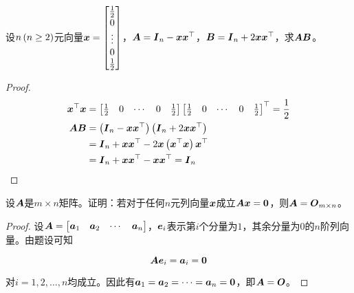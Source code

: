 \begin{problem}\label{problem-1.13}
设\(n\left( n\ge2 \right)\)元向量\(\boldsymbol{x}=\begin{bmatrix}\frac12\\0\\\vdots\\0\\\frac12\end{bmatrix}\)，\(\boldsymbol{A}=\boldsymbol{I}_n-\boldsymbol{x}\boldsymbol{x}^\top\)，\(\boldsymbol{B}=\boldsymbol{I}_n+2\boldsymbol{x}\boldsymbol{x}^\top\)，求\(\boldsymbol{A}\boldsymbol{B}\)。
\end{problem}
\begin{proof}
    \begin{align*}
        \boldsymbol{x}^\top\boldsymbol{x} & =
        \begin{bmatrix}
            \frac{1}{2} & 0 & \cdots & 0 & \frac{1}{2}
        \end{bmatrix}
        \begin{bmatrix}
            \frac{1}{2} & 0 & \cdots & 0 & \frac{1}{2}
        \end{bmatrix}^\top=\frac{1}{2}                                        \\
        \boldsymbol{A}\boldsymbol{B}      & =\left( \boldsymbol{I}_n-\boldsymbol{x}\boldsymbol{x}^\top \right)\left( \boldsymbol{I}_n+2\boldsymbol{x}\boldsymbol{x}^\top \right)  \\
                        & =\boldsymbol{I}_n+\boldsymbol{x}\boldsymbol{x}^\top-2\boldsymbol{x}\left( \boldsymbol{x}^\top\boldsymbol{x} \right)\boldsymbol{x}^\top \\
                        & =\boldsymbol{I}_n+\boldsymbol{x}\boldsymbol{x}^\top-\boldsymbol{x}\boldsymbol{x}^\top=\boldsymbol{I}_n
    \end{align*}
\end{proof}

\begin{problem}\label{problem-1.14}
设\(\boldsymbol{A}\)是\(m\times n\)矩阵。证明：若对于任何\(n\)元列向量\(\boldsymbol{x}\)成立\(\boldsymbol{A}\boldsymbol{x}=\boldsymbol{0}\)，则\(\boldsymbol{A}=\boldsymbol{O}_{m\times n}\)。
\end{problem}
\begin{proof}
    设\(\boldsymbol{A}=\begin{bmatrix}\boldsymbol{a}_1&\boldsymbol{a}_2&\cdots&\boldsymbol{a}_n\end{bmatrix}\)，\(\boldsymbol{e}_i\)表示第\(i\)个分量为\(1\)，其余分量为\(0\)的\(n\)阶列向量。由题设可知

    \begin{equation*}
        \boldsymbol{A}\boldsymbol{e}_i=\boldsymbol{a}_i=\boldsymbol{0}
    \end{equation*}

    对\(i=1,2,\dots,n\)均成立。因此有\(\boldsymbol{a}_1=\boldsymbol{a}_2=\cdots=\boldsymbol{a}_n=\boldsymbol{0}\)，即\(\boldsymbol{A}=\boldsymbol{O}\)。
\end{proof}

